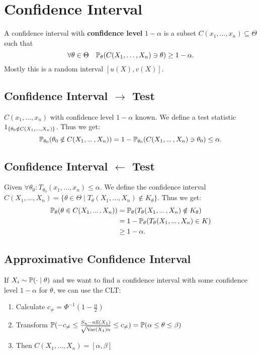 \section{Confidence Interval}
\begin{definition*}
  A confidence interval with \textbf{confidence level} \(1 - \alpha\) is a subset \(C(x_1, \ldots, x_n) \subseteq \Theta\) such that
  \[\forall \theta \in \Theta \quad \P_\theta(C(X_1, \ldots, X_n) \ni \theta) \geq 1 - \alpha.\]
  Mostly this is a random interval \([u(X), v(X)]\).
\end{definition*}

\subsection*{Confidence Interval \(\to\) Test}
\(C(x_1, \ldots, x_n)\) with confidence level \(1 - \alpha\) known. We define a test statistic \(\I_{\{\theta_0 \notin C(X_1, \ldots, X_n)\}}\). Thus we get:
\[\P_{\theta_0}(\theta_0 \notin C(X_1, \sdots, X_n)) = 1 - \P_{\theta_0}(C(X_1, \sdots, X_n)\ni \theta_0) \leq \alpha.\]

\subsection*{Confidence Interval \(\leftarrow\) Test}
Given \(\forall \theta_0: T_{\theta_0}(x_1, \ldots, x_n) \leq \alpha\). We define the confidence interval \(C(X_1, \ldots, X_n) = \{\theta \in \Theta \mid T_\theta(X_1, \ldots, X_n) \notin K_\theta\}\). Thus we get:
\begin{align*}
  \P_\theta(\theta \in C(X_1, \sdots, X_n)) &= \P_\theta(T_\theta(X_1, \sdots, X_n) \notin K_\theta) \\
  &= 1 - \P_\theta(T_\theta(X_1, \sdots, X_n) \in K) \\
  &\geq 1 - \alpha.
\end{align*}

\subsection*{Approximative Confidence Interval}
If \(X_i \sim \P(\cdot \mid \theta)\) and we want to find a confidence interval with some confidence level \(1 - \alpha\) for \(\theta\), we can use the CLT:

\begin{enumerate}
  \item Calculate \(c_{\neq} = \Phi^{-1}\left(1 - \frac{\alpha}{2}\right)\)
  \item Transform \(\P(-c_{\neq} \leq \frac{S_n - n \E(X_1)}{\sqrt{\Var(X_1) n}} \leq c_{\neq}) = \P(\alpha \leq \theta \leq \beta)\)
  \item Then \(C(X_1, \ldots, X_n) = [\alpha, \beta]\)
\end{enumerate}

